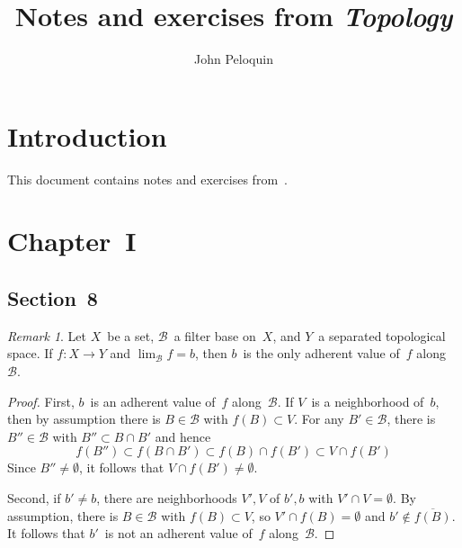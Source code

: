\documentclass[letterpaper,12pt]{article}
\title{Notes and exercises from \emph{Topology}}
\author{John Peloquin}
\date{}
\newcommand{\B}{\mathcal{B}}
\newcommand{\sect}{\cap}
\newcommand{\closure}[1]{\overline{#1}}
\theoremstyle{definition}
\theoremstyle{remark}
\newtheorem*{rmk}{Remark}
\begin{document}
\maketitle

\section*{Introduction}
This document contains notes and exercises from~\cite{choquet}.

\section*{Chapter~I}
\subsection*{Section~8}
\begin{rmk}
Let \(X\)~be a set, \(\B\)~a filter base on~\(X\), and \(Y\)~a separated topological space. If \(f:X\to Y\) and \(\lim_{\B}f=b\), then \(b\)~is the only adherent value of~\(f\) along~\(\B\).
\end{rmk}
\begin{proof}
First, \(b\)~is an adherent value of~\(f\) along~\(\B\). If \(V\)~is a neighborhood of~\(b\), then by assumption there is \(B\in\B\) with \(f(B)\subset V\). For any \(B'\in\B\), there is \(B''\in\B\) with \(B''\subset B\sect B'\) and hence
\[f(B'')\subset f(B\sect B')\subset f(B)\sect f(B')\subset V\sect f(B')\]
Since \(B''\neq\emptyset\), it follows that \(V\sect f(B')\ne\emptyset\).

Second, if \(b'\ne b\), there are neighborhoods \(V',V\) of \(b',b\) with \(V'\sect V=\emptyset\). By assumption, there is \(B\in\B\) with \(f(B)\subset V\), so \(V'\sect f(B)=\emptyset\) and \(b'\not\in\closure{f(B)}\). It follows that \(b'\)~is not an adherent value of~\(f\) along~\(\B\).
\end{proof}
\end{document}
